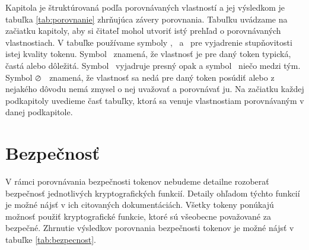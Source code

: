 Kapitola je štruktúrovaná podľa porovnávaných vlastností a jej výsledkom je tabuľka \ref{tab:porovnanie} zhrňujúca závery porovnania. Tabuľku uvádzame na začiatku kapitoly, aby si čitateľ mohol utvoriť istý prehľad o porovnávaných vlastnostiach. V tabuľke používame symboly \CIRCLE, \LEFTcircle ~a \Circle ~pre vyjadrenie stupňovitosti istej kvality tokenu. Symbol \CIRCLE ~znamená, že vlastnosť je pre daný token typická, častá alebo dôležitá. Symbol \Circle ~vyjadruje presný opak a symbol \LEFTcircle ~niečo medzi tým. Symbol $\varoslash$ ~znamená, že vlastnosť sa nedá pre daný token posúdiť alebo z nejakého dôvodu nemá zmysel o nej uvažovať a porovnávať ju. Na začiatku každej podkapitoly uvedieme časť tabuľky, ktorá sa venuje vlastnostiam porovnávaným v danej podkapitole.

\section{Bezpečnosť}

V rámci porovnávania bezpečnosti tokenov nebudeme detailne rozoberať bezpečnosť jednotlivých kryptografických funkcií. Detaily ohľadom týchto funkcií je možné nájsť v ich citovaných dokumentáciách. Všetky tokeny ponúkajú možnosť použiť kryptografické funkcie, ktoré sú všeobecne považované za bezpečné. Zhrnutie výsledkov porovnania bezpečnosti tokenov je možné nájsť v tabuľke \ref{tab:bezpecnost}.

\begin{table}[H]
  \begin{center}
    \caption{Bezpečnosť tokenov}
    \label{tab:bezpecnost} %

  \end{center}
\end{table}

